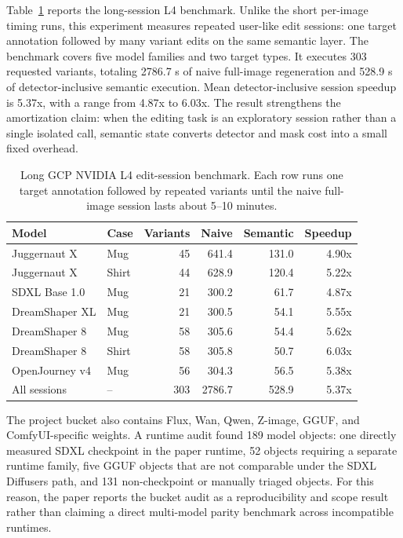\documentclass[final,5p,times,number,sort&compress]{elsarticle}
\begin{document}
Table~\ref{tab:heavy-session} reports the long-session L4 benchmark. Unlike the short per-image timing runs, this experiment measures repeated user-like edit sessions: one target annotation followed by many variant edits on the same semantic layer. The benchmark covers five model families and two target types. It executes 303 requested variants, totaling 2786.7 s of naive full-image regeneration and 528.9 s of detector-inclusive semantic execution. Mean detector-inclusive session speedup is 5.37x, with a range from 4.87x to 6.03x. The result strengthens the amortization claim: when the editing task is an exploratory session rather than a single isolated call, semantic state converts detector and mask cost into a small fixed overhead.

\begin{table}[t]
\centering
\scriptsize
\caption{Long GCP NVIDIA L4 edit-session benchmark. Each row runs one target annotation followed by repeated variants until the naive full-image session lasts about 5--10 minutes.}
\label{tab:heavy-session}
\begin{tabular}{llrrrr}
\toprule
Model & Case & Variants & Naive & Semantic & Speedup \\
\midrule
Juggernaut X & Mug & 45 & 641.4 & 131.0 & 4.90x \\
Juggernaut X & Shirt & 44 & 628.9 & 120.4 & 5.22x \\
SDXL Base 1.0 & Mug & 21 & 300.2 & 61.7 & 4.87x \\
DreamShaper XL & Mug & 21 & 300.5 & 54.1 & 5.55x \\
DreamShaper 8 & Mug & 58 & 305.6 & 54.4 & 5.62x \\
DreamShaper 8 & Shirt & 58 & 305.8 & 50.7 & 6.03x \\
OpenJourney v4 & Mug & 56 & 304.3 & 56.5 & 5.38x \\
\midrule
All sessions & -- & 303 & 2786.7 & 528.9 & 5.37x \\
\bottomrule
\end{tabular}
\end{table}

The project bucket also contains Flux, Wan, Qwen, Z-image, GGUF, and ComfyUI-specific weights. A runtime audit found 189 model objects: one directly measured SDXL checkpoint in the paper runtime, 52 objects requiring a separate runtime family, five GGUF objects that are not comparable under the SDXL Diffusers path, and 131 non-checkpoint or manually triaged objects. For this reason, the paper reports the bucket audit as a reproducibility and scope result rather than claiming a direct multi-model parity benchmark across incompatible runtimes.
\end{document}
